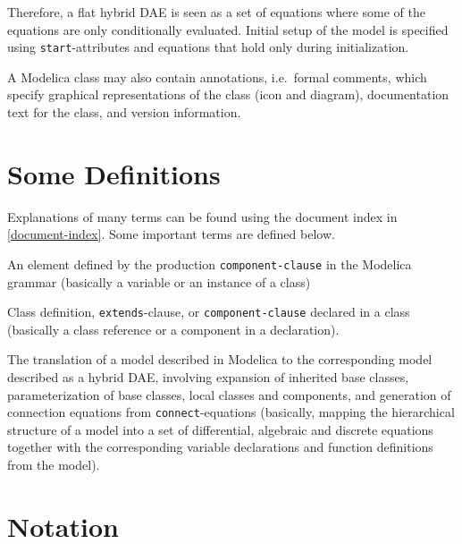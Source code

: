 Therefore, a flat hybrid DAE is seen as a set of equations where some of the equations are only conditionally evaluated.
Initial setup of the model is specified using \lstinline!start!-attributes and equations that hold only during initialization.

A Modelica class may also contain annotations, i.e.\ formal comments, which specify graphical representations of the class (icon and diagram), documentation text for the class, and version information.

\section{Some Definitions}\label{some-definitions}

Explanations of many terms can be found using the document index in \cref{document-index}.
Some important terms are defined below.

\begin{definition}[Component]
An element defined by the production \lstinline[language=grammar]!component-clause! in the Modelica grammar (basically a variable or an instance of a class)
\end{definition}

\begin{definition}[Element]
Class definition, \lstinline!extends!-clause, or \lstinline[language=grammar]!component-clause! declared in a class (basically a class reference or a component in a declaration).
\end{definition}

\begin{definition}[Flattening]
The translation of a model described in Modelica to the corresponding model described as a hybrid DAE, involving expansion of inherited base classes, parameterization of base classes, local classes
and components, and generation of connection equations from \lstinline!connect!-equations (basically, mapping the hierarchical structure of a model into a set of differential, algebraic and discrete equations together with the corresponding variable declarations and function definitions from the model).
\end{definition}


\section{Notation}\label{notation}

